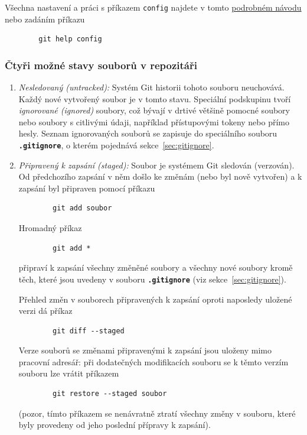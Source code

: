 \documentclass[a4paper,11pt,twoside]{article}
\def\code#1{\textnormal{\texttt{#1}}}
\def\file#1{\textnormal{\textbf{\texttt{#1}}}}
\theoremstyle{red}
\theoremstyle{green}
\begin{document}
    Všechna nastavení a práci s příkazem \code{config} najdete v tomto \href{https://git-scm.com/docs/git-config}{podrobném návodu} nebo zadáním příkazu
    \begin{lstlisting}
        git help config\end{lstlisting}

\subsubsection{Čtyři možné stavy souborů v repozitáři}
    \begin{enumerate}
        \item \emph{Nesledovaný (untracked):} 
            Systém Git historii tohoto souboru neuchovává.
            Každý nové vytvořený soubor je v tomto stavu.
            Speciální podskupinu tvoří \emph{ignorované (ignored)} soubory, což bývají v drtivé většině pomocné soubory nebo soubory s citlivými údaji, například přístupovými tokeny nebo přímo hesly.
            Seznam ignorovaných souborů se zapisuje do speciálního souboru \file{.gitignore}, o kterém pojednává sekce~\ref{sec:gitignore}.

        \item \emph{Připravený k zapsání (staged):} 
            Soubor je systémem Git sledován (verzován).
            Od předchozího zapsání v něm došlo ke změnám (nebo byl nově vytvořen) a k zapsání byl připraven pomocí příkazu
            \begin{lstlisting}
        git add soubor\end{lstlisting}
            Hromadný příkaz
            \begin{lstlisting}
        git add *\end{lstlisting}
            připraví k zapsání všechny změněné soubory a všechny nové soubory kromě těch, které jsou uvedeny v souboru \file{.gitignore} (viz sekce~\ref{sec:gitignore}).

            Přehled změn v souborech připravených k zapsání oproti naposledy uložené verzi dá příkaz
            \begin{lstlisting}
        git diff --staged\end{lstlisting}

            Verze souborů se změnami připravenými k zapsání jsou uloženy mimo pracovní adresář: při dodatečných modifikacích souboru se k těmto verzím souboru lze vrátit příkazem
            \begin{lstlisting}
        git restore --staged soubor\end{lstlisting}
            (pozor, tímto příkazem se nenávratně ztratí všechny změny v souboru, které byly provedeny od jeho poslední přípravy k zapsání).


\end{enumerate}
\end{document}

